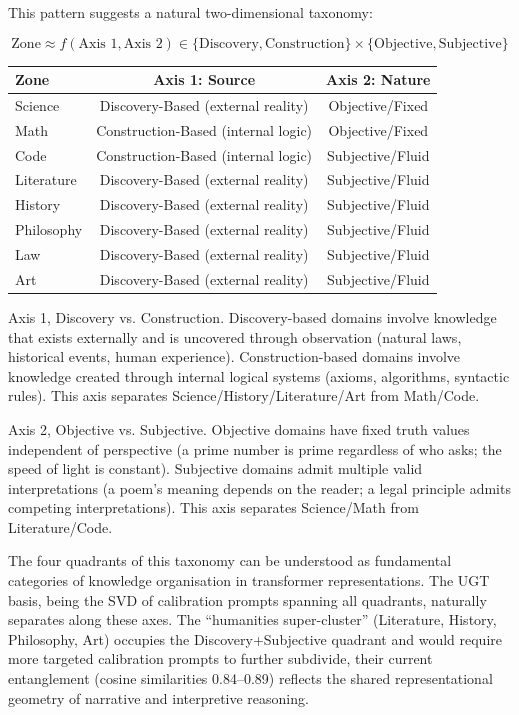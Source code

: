 \documentclass[11pt]{article}
\begin{document}
This pattern suggests a natural two-dimensional taxonomy:

\begin{equation}
\text{Zone} \approx f(\text{Axis 1}, \text{Axis 2}) \in \{\text{Discovery}, \text{Construction}\} \times \{\text{Objective}, \text{Subjective}\}
\end{equation}

\begin{center}
\begin{tabular}{lcc}
\toprule
Zone & Axis 1: Source & Axis 2: Nature \\
\midrule
Science    & Discovery-Based (external reality) & Objective/Fixed \\
Math       & Construction-Based (internal logic) & Objective/Fixed \\
Code       & Construction-Based (internal logic) & Subjective/Fluid \\
Literature & Discovery-Based (external reality) & Subjective/Fluid \\
History    & Discovery-Based (external reality) & Subjective/Fluid \\
Philosophy & Discovery-Based (external reality) & Subjective/Fluid \\
Law        & Discovery-Based (external reality) & Subjective/Fluid \\
Art        & Discovery-Based (external reality) & Subjective/Fluid \\
\bottomrule
\end{tabular}
\end{center}

Axis 1, Discovery vs. Construction. Discovery-based domains involve knowledge that exists externally and is uncovered through observation (natural laws, historical events, human experience). Construction-based domains involve knowledge created through internal logical systems (axioms, algorithms, syntactic rules). This axis separates Science/History/Literature/Art from Math/Code.

Axis 2, Objective vs. Subjective. Objective domains have fixed truth values independent of perspective (a prime number is prime regardless of who asks; the speed of light is constant). Subjective domains admit multiple valid interpretations (a poem's meaning depends on the reader; a legal principle admits competing interpretations). This axis separates Science/Math from Literature/Code.

The four quadrants of this taxonomy can be understood as fundamental categories of knowledge organisation in transformer representations. The UGT basis, being the SVD of calibration prompts spanning all quadrants, naturally separates along these axes. The ``humanities super-cluster'' (Literature, History, Philosophy, Art) occupies the Discovery+Subjective quadrant and would require more targeted calibration prompts to further subdivide, their current entanglement (cosine similarities 0.84--0.89) reflects the shared representational geometry of narrative and interpretive reasoning.
\end{document}
